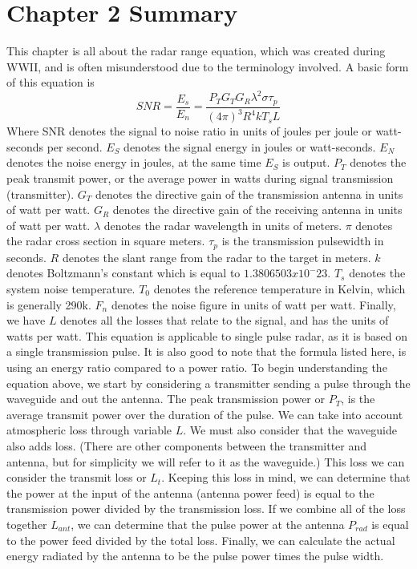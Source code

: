 \documentclass[12pt]{article}
\begin{document}
\section{Chapter 2 Summary}
This chapter is all about the radar range equation, which was created during WWII, and is often misunderstood due to the terminology involved. A basic form of this equation is 
\begin{equation}
    SNR = \frac{E_s}{E_n} =  \frac{P_T G_T G_R \lambda^2 \sigma \tau_p }{(4\pi)^3 R^4 k T_s L}
\end{equation}
Where SNR denotes the signal to noise ratio in units of joules per joule or watt-seconds per second. $E_S$ denotes the signal energy in joules or watt-seconds. $E_N$ denotes the noise energy in joules, at the same time $E_S$  is output. $P_T$ denotes the peak transmit power, or the average power in watts during signal transmission (transmitter). $G_T$ denotes the directive gain of the transmission antenna in units of watt per watt. $G_R$ denotes the directive gain of the receiving antenna in units of watt per watt. $\lambda$ denotes the radar wavelength in units of meters. $\pi$ denotes the radar cross section in square meters. $\tau_p$ is the transmission pulsewidth in seconds. $R$ denotes the slant range from the radar to the target in meters. $k$ denotes Boltzmann's constant which is equal to $1.3806503x10^-23$. $T_s$ denotes the system noise temperature. $T_0$ denotes the reference temperature in Kelvin, which is generally 290k. $F_n$ denotes the noise figure in units of watt per watt. Finally, we have $L$ denotes all the losses that relate to the signal, and has the units of watts per watt. 
This equation is applicable to single pulse radar, as it is based on a single transmission pulse. It is also good to note that the formula listed here, is using an energy ratio compared to a power ratio. 
To begin understanding the equation above, we start by considering a transmitter sending a pulse through the waveguide and out the antenna. The peak transmission power or $P_T$, is the average transmit power over the duration of the pulse. We can take into account atmospheric loss through variable $L$. We must also consider that the waveguide also adds loss. (There are other components between the transmitter and antenna, but for simplicity we will refer to it as the waveguide.) This loss we can consider the transmit loss or $L_t$. Keeping this loss in mind, we can determine that the power at the input of the antenna (antenna power feed) is equal to the transmission power divided by the transmission loss. If we combine all of the loss together $L_{ant}$, we can determine that the pulse power at the antenna $P_{rad}$ is equal to the power feed divided by the total loss. Finally, we can calculate the actual energy radiated by the antenna to be the pulse power times the pulse width. 
\end{document}
